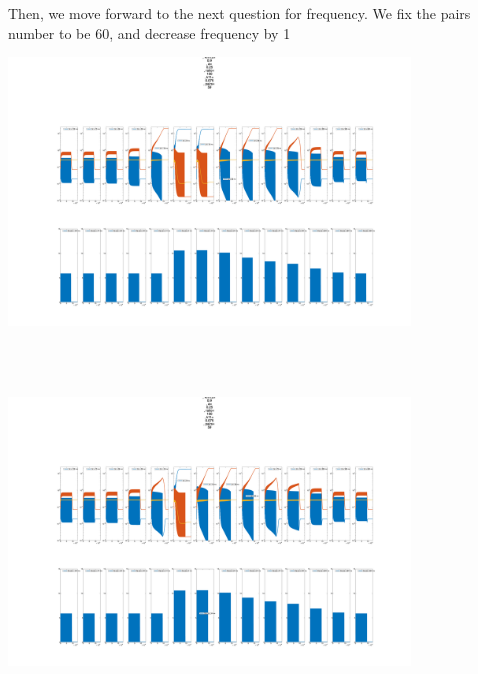 \documentclass{article}
\begin{document}
Then, we move forward to the next question for frequency. We fix the pairs number to be 60, and decrease frequency by 1
\\
\begin{minipage}{\textwidth} %
    \centering
    \includegraphics[width=0.8\textwidth]{pairs=60_hertz=0.70.png} %
    \label{fig:a0.25}
\end{minipage}\\
\\
\begin{minipage}{\textwidth} %
    \centering
    \includegraphics[width=0.8\textwidth]{pairs=60_hertz=0.65.png} %
    \label{fig:a0.25}
\end{minipage}\\
\\
\end{document}
